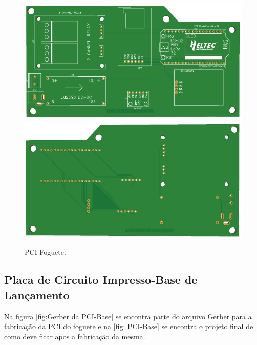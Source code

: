 \begin{figure}[H]
  \centering
  \includegraphics[scale=0.4]{Figuras/pci fabric/foguete_top.png}
    \includegraphics[scale=0.4]{Figuras/pci fabric/foguete_bottom.png}
  \caption{ PCI-Foguete.}
  \label{fig: PCI-Foguete}
\end{figure}

\subsection{Placa de Circuito Impresso-Base de Lançamento}

\par Na figura \ref{fig:Gerber da PCI-Base} se encontra parte do arquivo Gerber para a fabricação da PCI do foguete e na \ref{fig: PCI-Base} se encontra o projeto final de como deve ficar apos a fabricação da mesma.



